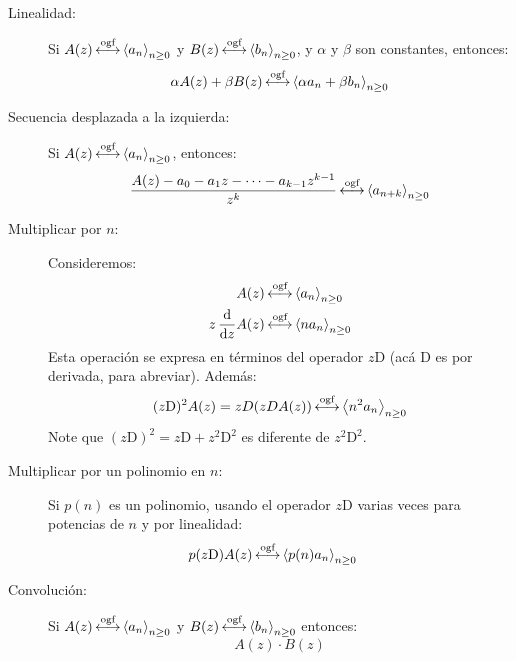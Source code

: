   \begin{description}
  \item[Linealidad:]
    Si \(A(z) \operatorname{\stackrel{\text{ogf}}{\longleftrightarrow}} \left\langle a_n \right\rangle_{n \ge 0}\)
    y \(B(z) \operatorname{\stackrel{\text{ogf}}{\longleftrightarrow}} \left\langle b_n \right\rangle_{n \ge 0}\),
    y \(\alpha\) y \(\beta\) son constantes,
    entonces:
    \begin{equation*}
      \alpha A(z) + \beta B(z)
         \operatorname{\stackrel{\text{ogf}}{\longleftrightarrow}} \left\langle
                \alpha a_n + \beta b_n
              \right\rangle_{n \ge 0}
    \end{equation*}
  \item[Secuencia desplazada a la izquierda:]
    Si
    \(A(z) \operatorname{\stackrel{\text{ogf}}{\longleftrightarrow}} \left\langle a_n \right\rangle_{n \ge 0}\),
    entonces:
    \begin{equation*}
      \frac{A(z) - a_0 - a_1 z - \dotsb - a_{k - 1} z^{k - 1}}{z^k}
        \operatorname{\stackrel{\text{ogf}}{\longleftrightarrow}} \left\langle a_{n + k}\right\rangle_{n \ge 0}
    \end{equation*}
  \item[Multiplicar por \(n\):]
    Consideremos:
    \begin{align*}
      A(z)
        &\operatorname{\stackrel{\text{ogf}}{\longleftrightarrow}} \left\langle a_n\right\rangle_{n \ge 0} \\
      z \, \frac{\mathrm{d}}{\mathrm{d} z} A(z)
        &\operatorname{\stackrel{\text{ogf}}{\longleftrightarrow}} \left\langle n a_n\right\rangle_{n \ge 0}
    \end{align*}
    Esta operación
    se expresa en términos del operador \(z \mathrm{D}\)
    (acá \(\mathrm{D}\) es por derivada,
     para abreviar).
    Además:
    \begin{equation*}
      (z \mathrm{D})^2 A(z)
        = z D (z D A(z))
        \operatorname{\stackrel{\text{ogf}}{\longleftrightarrow}} \left\langle n^2 a_n\right\rangle_{n \ge 0}
    \end{equation*}
    Note que
      \((z \mathrm{D})^2 = z \mathrm{D} + z^2 \mathrm{D}^2\)
    es diferente de \(z^2 \mathrm{D}^2\).
  \item[Multiplicar por un polinomio en \(n\):]
    Si \(p(n)\) es un polinomio,
    usando el operador \(z \mathrm{D}\) varias veces
    para potencias de \(n\)
    y por linealidad:
    \begin{align*}
      p(z \mathrm{D}) A(z)
        &\operatorname{\stackrel{\text{ogf}}{\longleftrightarrow}} \left\langle p(n) a_n \right\rangle_{n \ge 0}
    \end{align*}
  \item[Convolución:]
    Si \(A(z) \operatorname{\stackrel{\text{ogf}}{\longleftrightarrow}} \left\langle a_n \right\rangle_{n \ge 0}\)
    y \(B(z) \operatorname{\stackrel{\text{ogf}}{\longleftrightarrow}} \left\langle b_n \right\rangle_{n \ge 0}\)
    entonces:
    \begin{equation*}
      A(z) \cdot B(z)

\end{equation*}
\end{description}
